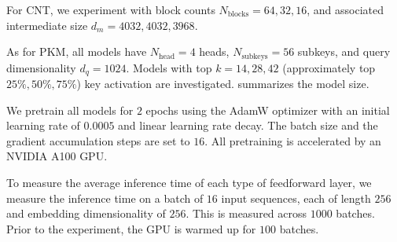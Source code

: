 For CNT, we experiment with block counts $N_\text{blocks}=64,32,16$, and associated intermediate size $d_m = 4032, 4032, 3968$.

As for PKM, all models have $N_\text{head}=4$ heads, $N_\text{subkeys}=56$ subkeys, and query dimensionality $d_q=1024$. Models with top $k=14,28,42$ (approximately top $25\%,50\%,75\%$) key activation are investigated.  summarizes the model size. 

We pretrain all models for $2$ epochs using the AdamW optimizer with an initial learning rate of $0.0005$ and linear learning rate decay. The batch size and the gradient accumulation steps are set to $16$. All pretraining is accelerated by an NVIDIA A100 GPU.

To measure the average inference time of each type of feedforward layer, we measure the inference time on a batch of $16$ input sequences, each of length $256$ and embedding dimensionality of $256$. This is measured across $1000$ batches. Prior to the experiment, the GPU is warmed up for $100$ batches.


